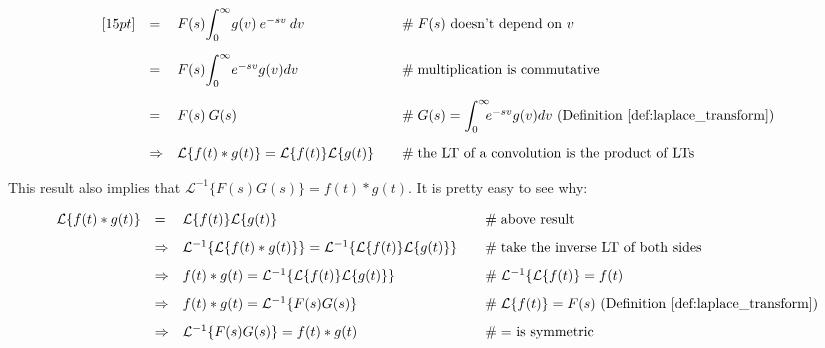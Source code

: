 \documentclass{article}
\theoremstyle{definition}
\begin{document}
\begin{equation*}
\begin{array}{lllll}
[15pt]
&=& F(s) \mathlarger{\int}^\infty_0 g(v) \: e^{-sv} \: dv                                                                               &\quad \mathrel{\#} \text{$F(s)$ doesn't depend on $v$}                                                                            \\
[15pt]
&=& F(s) \mathlarger{\int}^\infty_0 e^{-sv}  g(v) dv                                                                                    &\quad \mathrel{\#} \text{multiplication is commutative}                                                                              \\
[15pt]
&=& F(s)\:G(s)                                                                                                                   &\quad \mathrel{\#} G(s) = \mathlarger{\int}^\infty_0 \!\! e^{-sv}  g(v) dv \text{ (Definition \ref{def:laplace_transform})}      \\   
[15pt]
&\Rightarrow& \mathcal{L}\{f(t) \ast g(t)\} = \mathcal{L}\{f(t)\}\mathcal{L}\{g(t)\}                                        &\quad \mathrel{\#} \text{the LT of a convolution is the product of LTs}                                                       \\
\end{array}
\end{equation*}

\bigskip
\bigskip
\noindent
This result also implies that $\mathcal{L}^{-1}\{F(s) G(s)\}  = f(t) \ast g(t)$. It is pretty easy to see why:

\bigskip
\begin{equation*}
\begin{array}{lllll}
\mathcal{L}\{f(t) \ast g(t)\} 
&=& \mathcal{L}\{f(t)\}\mathcal{L}\{g(t)\}                                                                                                                               &\quad \mathrel{\#} \text{above result}                                      \\
[8pt]
&\Rightarrow& \mathcal{L}^{-1}\{\mathcal{L}\{f(t) \ast g(t)\}\} =  \mathcal{L}^{-1}\{\mathcal{L}\{f(t)\}\mathcal{L}\{g(t)\}\}     &\quad \mathrel{\#} \text{take the inverse LT of both sides}       \\
[8pt]
&\Rightarrow& f(t) \ast g(t) =  \mathcal{L}^{-1}\{\mathcal{L}\{f(t)\}\mathcal{L}\{g(t)\}\}                                                          &\quad \mathrel{\#}   \mathcal{L}^{-1}\{\mathcal{L}\{f(t)\} = f(t)  \\
[8pt]
&\Rightarrow& f(t) \ast g(t) =  \mathcal{L}^{-1}\{F(s) G(s)\}                                                                                                  &\quad \mathrel{\#} \text{$\mathcal{L}\{f(t)\} = F(s)$ (Definition \ref{def:laplace_transform})} \\
[8pt]
&\Rightarrow& \mathcal{L}^{-1}\{F(s) G(s)\} = f(t) \ast g(t)                                                                                                  &\quad \mathrel{\#} \text{$=$ is symmetric}
\end{array}
\end{equation*}
\end{document}
